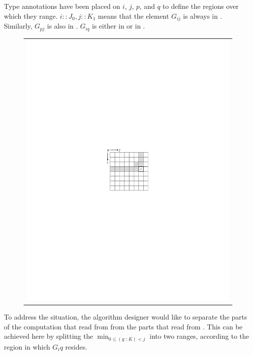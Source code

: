 \medskip
Type annotations have been placed on $i$, $j$, $p$, and $q$ to define the regions
over which they range. $i::J_0, j::K_1$ means that the element $G_{ij}$
is always in . Similarly, $G_{pj}$ is also in . $G_{iq}$ is either in
 or in .

\begin{figure}
\begin{tabular}{l}\includegraphics{img/gap-depend}\end{tabular}
\caption{\label{intro:gap dependency matrix}}
\end{figure}

To address the situation, the algorithm designer would like to separate the parts
of the computation that read from  from the parts that read from .
This can be achieved here by splitting the $\min_{0\leq(q::K)<j}$ into two
ranges, according to the region in which $G_iq$ resides.

